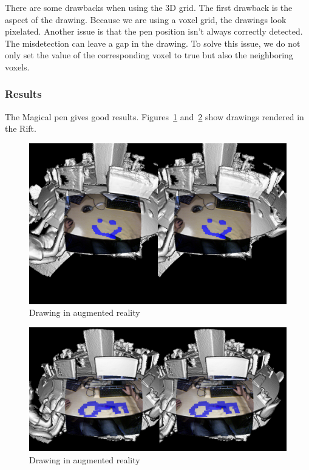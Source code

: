 \documentclass[12pt, twoside]{article}
\begin{document}
There are some drawbacks when using the 3D grid. The first drawback is the aspect of the drawing. Because we are using a voxel grid, the drawings look pixelated. Another issue is that the pen position isn't always correctly detected. The misdetection can leave a gap in the drawing. To solve this issue, we do not only set the value of the corresponding voxel to true but also the neighboring voxels.

\subsubsection{Results}
The Magical pen gives good results. Figures~\ref{fig:pen1} and~\ref{fig:pen2} show drawings rendered in the Rift.
\begin{figure}[!h]
  \centering
  \includegraphics[scale=0.3]{pen1.png}
  \caption{\label{fig:pen1} Drawing in augmented reality}
\end{figure}

\begin{figure}[!h]
  \centering
  \includegraphics[scale=0.3]{pen2.png}
  \caption{\label{fig:pen2} Drawing in augmented reality}
\end{figure}
\end{document}
